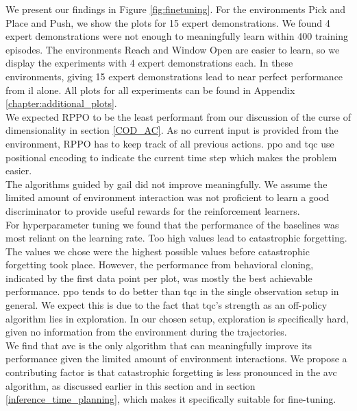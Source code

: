 We present our findings in Figure \ref{fig:finetuning}. 
For the environments Pick and Place and Push, we show the plots for 15 expert demonstrations. We found 4 expert demonstrations were not 
enough to meaningfully learn within 400 training episodes. The environments Reach and Window Open are easier to learn, so we display the 
experiments with 4 expert demonstrations each. In these environments, giving 15 expert demonstrations lead to near perfect performance from \ac{il} alone. 
All plots for all experiments can be found in Appendix \ref{chapter:additional_plots}.\\

We expected RPPO to be the least performant from our discussion of the curse of dimensionality in section \ref{COD_AC}. As no current input 
is provided from the environment, RPPO has to keep track of all previous actions. \ac{ppo} and \ac{tqc} use positional encoding to indicate the current 
time step which makes the problem easier.\\ 

The algorithms guided by \ac{gail} did not improve meaningfully. We assume the limited amount of environment 
interaction was not proficient to learn a good discriminator to provide useful rewards for the reinforcement learners.\\ 

For hyperparameter tuning we found that the performance of the baselines was most 
reliant on the learning rate. Too high values lead to catastrophic forgetting. The values we chose were the highest possible values before 
catastrophic forgetting took place. However, the performance from behavioral cloning, indicated by the first data point per plot, was mostly 
the best achievable performance. \ac{ppo} tends to do better than \ac{tqc} in the single observation setup in general. We expect this is due to the 
fact that \ac{tqc}'s strength as an off-policy algorithm lies in exploration. In our chosen setup, exploration is specifically hard, given no 
information from the environment during the trajectories.\\

We find that \ac{avc} is the only algorithm that can meaningfully improve its performance given the limited amount of environment interactions. 
We propose a contributing factor is that catastrophic forgetting is less pronounced in the \ac{avc} algorithm, as discussed earlier in this section and in section \ref{inference_time_planning}, 
which makes it specifically suitable for fine-tuning.



